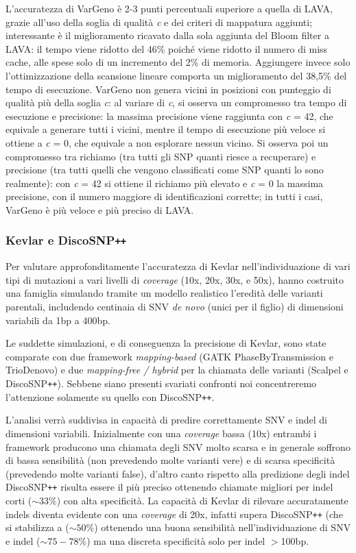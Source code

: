 \documentclass[../main.tex]{subfiles}
\begin{document}
L'accuratezza di VarGeno è 2-3 punti percentuali superiore a quella di LAVA, grazie all'uso della soglia di qualità \textit{c} e dei criteri di mappatura aggiunti; interessante è il miglioramento ricavato dalla sola aggiunta del Bloom filter a LAVA: il tempo viene ridotto del 46\% poiché viene ridotto il numero di miss cache, alle spese solo di un incremento del 2\% di memoria. Aggiungere invece solo l'ottimizzazione della scansione lineare comporta un miglioramento del 38,5\% del tempo di esecuzione. VarGeno non genera vicini in posizioni con punteggio di qualità più della soglia \textit{c}: al variare di \textit{c}, si osserva un compromesso tra tempo di esecuzione e precisione: la massima precisione viene raggiunta con \textit{c} = 42, che equivale a generare tutti i vicini, mentre il tempo di esecuzione più veloce si ottiene a \textit{c} = 0, che equivale a non esplorare nessun vicino. Si osserva poi un compromesso tra richiamo (tra tutti gli SNP quanti riesce a recuperare) e precisione (tra tutti quelli che vengono classificati come SNP quanti lo sono realmente): con \textit{c} = 42 si ottiene il richiamo più elevato e \textit{c} = 0 la massima precisione, con il numero maggiore di identificazioni corrette; in tutti i casi, VarGeno è più veloce e più preciso di LAVA. 

\subsubsection{Kevlar e DiscoSNP\texttt{++}}

Per valutare approfonditamente l'accuratezza di Kevlar nell'individuazione di vari tipi di mutazioni a vari livelli di \textit{coverage} (10x, 20x, 30x, e 50x), \cite{standage2019kevlar} hanno costruito una famiglia simulando tramite un modello realistico l'eredità delle varianti parentali, includendo centinaia di SNV \textit{de novo} (unici per il figlio) di dimensioni variabili da 1bp a 400bp. 

Le suddette simulazioni, e di conseguenza la precisione di Kevlar, sono state comparate con due framework \textit{mapping-based} (GATK PhaseByTransmission e TrioDenovo) e due \textit{mapping-free / hybrid} per la chiamata delle varianti (Scalpel e DiscoSNP\texttt{++}). Sebbene siano presenti svariati confronti noi concentreremo l'attenzione solamente su quello con DiscoSNP\texttt{++}. 

L'analisi verrà suddivisa in capacità di predire correttamente SNV e indel di dimensioni variabili. Inizialmente con una \textit{coverage} bassa (10x) entrambi i framework producono una chiamata degli SNV molto scarsa e in generale soffrono di bassa sensibilità (non prevedendo molte varianti vere) e di scarsa specificità (prevedendo molte varianti false), d'altro canto rispetto alla predizione degli indel DiscoSNP\texttt{++} risulta essere il più preciso ottenendo chiamate migliori per indel corti ($\sim 33\%$) con alta specificità. La capacità di Kevlar di rilevare accuratamente indels diventa evidente con una \textit{coverage} di 20x, infatti supera DiscoSNP\texttt{++} (che si stabilizza a ($\sim 50\%$) ottenendo una buona sensibilità nell'individuazione di SNV e indel ($\sim 75-78\%$) ma una discreta specificità solo per indel $>$100bp. 
\end{document}
